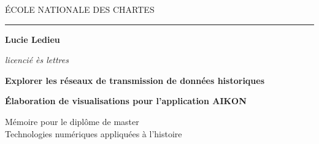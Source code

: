 \begin{titlepage}
	\begin{center}
		
		\bigskip
		
		\begin{large}
			ÉCOLE NATIONALE DES CHARTES
		\end{large}
		\begin{center}\rule{2cm}{0.02cm}\end{center}
		
		\bigskip
		\bigskip
		\bigskip
		\begin{Large}
			\textbf{Lucie Ledieu}\\
		\end{Large}
		\begin{normalsize} \textit{licencié ès lettres}\\
		\end{normalsize}
		
		\bigskip
		\bigskip
		\bigskip
		
		\begin{Huge}
			\textbf{Explorer les réseaux de transmission de données historiques}\\
		\end{Huge}
		\bigskip
		\bigskip
		\begin{LARGE}
			\textbf{Élaboration de visualisations pour l'application AIKON}\\
		\end{LARGE}
		
		\bigskip
		\bigskip
		\bigskip
		\begin{large}
		\end{large}
		\vfill
		
		\begin{large}
			Mémoire pour le diplôme de master \\
			\og Technologies numériques appliquées à l'histoire~\fg\\
		\end{large}
		
	\end{center}
\end{titlepage}